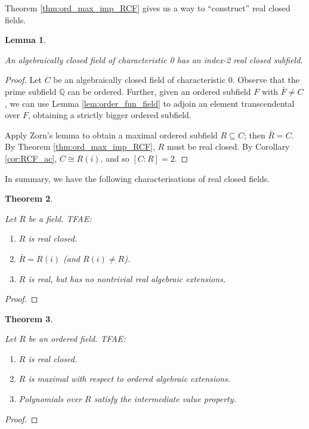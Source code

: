 \documentclass{article}
\newtheorem{theorem}{Theorem}[section]
\newtheorem{lemma}[theorem]{Lemma}
\newcommand{\Q}{\mathbb{Q}}
\newcommand{\leanok}{}
\newcommand{\lean}[1]{}
\newcommand{\uses}[1]{}
\begin{document}
Theorem \ref{thm:ord_max_imp_RCF} gives us a way to ``construct'' real closed fields.

\begin{lemma}
  \label{lem:ACF_ind_2_RCF}
  \uses{def:RCF}
  An algebraically closed field of characteristic 0 has an index-2 real closed subfield.
\end{lemma}
\begin{proof}
  \uses{lem:order_fun_field, thm:ord_max_imp_RCF, cor:RCF_ac}
  Let $C$ be an algebraically closed field of characteristic 0. Observe that the prime subfield $\Q$ can be ordered. Further, given an ordered subfield $F$ with $\bar{F}\neq C$, we can use Lemma \ref{lem:order_fun_field} to adjoin an element transcendental over $F$, obtaining a strictly bigger ordered subfield.

  Apply Zorn's lemma to obtain a maximal ordered subfield $R\subseteq C$; then $\bar{R}=C$. By Theorem \ref{thm:ord_max_imp_RCF}, $R$ must be real closed. By Corollary \ref{cor:RCF_ac}, $C\cong R(i)$, and so $[C:R]=2$.
\end{proof}

In summary, we have the following characterisations of real closed fields.

\begin{theorem}
  \label{thm:RCF_tfae}
  \uses{def:RCF}
  Let $R$ be a field. TFAE:
  \begin{enumerate}
    \item $R$ is real closed.
    \item $\bar{R}=R(i)$ (and $R(i)\neq R$).
    \item $R$ is real, but has no nontrivial real algebraic extensions.
  \end{enumerate}
\end{theorem}
\begin{proof}
  \uses{cor:RCF_ac,lem:FTAlg_converse_alg_closure,lem:RCF_max,cor:real_max_imp_RCF}
\end{proof}

\begin{theorem}
  \label{thm:RCF_tfae_ord}
  \uses{def:RCF}
  \lean{IsRealClosed.tfae_ord}
  \leanok
  Let $R$ be an ordered field. TFAE:
  \begin{enumerate}
    \item $R$ is real closed.
    \item $R$ is maximal with respect to ordered algebraic extensions.
    \item Polynomials over $R$ satisfy the intermediate value property.
  \end{enumerate}
\end{theorem}
\begin{proof}
  \uses{lem:IVP_poly,thm:IVP_poly_imp_RCF,lem:RCF_max_ord,thm:ord_max_imp_RCF}
  \leanok
\end{proof}
\end{document}
